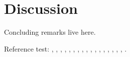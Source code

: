 \section{Discussion}
\label{sec:discussion}

Concluding remarks live here.

Reference test:
\cite{ArcherWest2003},
\cite{BarrettJolleyetal2010},
\cite{Chaetal2009},
\cite{Chuetal2006},
\cite{Clarketal2011},
\cite{Grishkoetal2010},
\cite{Halletal1996},
\cite{Hille2001},
\cite{HorriganAldrich2002},
\cite{LesageLazdunski2000},
\cite{Lewisetal2011},
\cite{Maleckaretal2009},
\cite{MillwardSadleretal2000}
\cite{Nygrenetal1998},
\cite{RadhakrishnanHindmarsh1993},
\cite{Scholz2002},
\cite{Sugimotoetal1996},
\cite{Tsugaetal2001},
\cite{UNKNOWN}.


